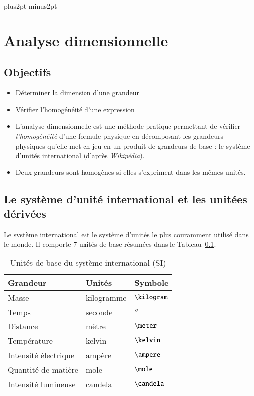 \documentclass[12pt]{book}
\begin{document}
\def\author{Théo Tassin}
\def\title{L2 STEP - Électromagnétisme}
\parskip 10pt plus2pt minus2pt
\chapter*{Analyse dimensionnelle}
\section*{Objectifs}
\begin{itemize}
	\item Déterminer la dimension d'une grandeur
	\item Vérifier l'homogénéité d'une expression
\end{itemize}

\begin{defn}
	\begin{itemize}
		\item L'analyse dimensionnelle est une méthode 
		  pratique permettant de 
		  vérifier \emph{l'homogénéité} d'une formule physique en décomposant les 
		  grandeurs physiques qu'elle met en jeu en un produit de grandeurs 
		  de base : le système d'unités international 
		  (d'après \textit{Wikipédia}).
		 \item Deux grandeurs sont homogènes si elles s'expriment dans les
		   mêmes unités.
	\end{itemize}
\end{defn}

\section{Le système d'unité international et les unitées dérivées}
Le système international est le système d'unités le plus couramment utilisé dans 
le monde. Il comporte 7 unités de base résumées dans le Tableau~\ref{usi}.

\begin{table}[ht!]
	\centering
	\caption{Unités de base du système international (SI)}
	\begin{tabular}{lll}
	\textbf{Grandeur} & \textbf{Unités} & \textbf{Symbole} \\ \hline
	Masse & kilogramme & $\kilogram$ \\ 
	Temps & seconde & $\second$ \\
	Distance & mètre & $\meter$ \\
	Température & kelvin & $\kelvin$ \\
	Intensité électrique & ampère & $\ampere$ \\
	Quantité de matière & mole & $\mole$ \\
	Intensité lumineuse & candela & $\candela$
	\end{tabular}
	\label{usi}
\end{table}
\end{document}
